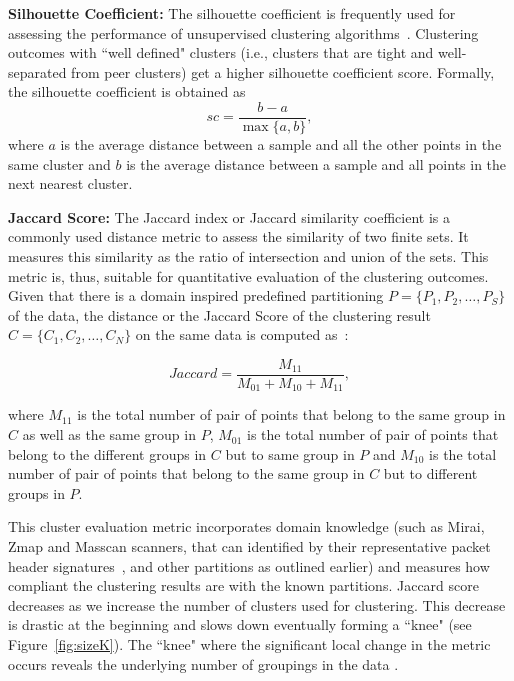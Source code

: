 \documentclass[manuscript, nonacm]{acmart}
\newcommand{\para}[1]{\vspace*{1ex}\noindent\textbf{#1} }
\begin{document}
\para{Silhouette Coefficient:} The silhouette coefficient is frequently used for
assessing the performance of unsupervised clustering algorithms~\cite{Rousseeuw87Silhouettes}. Clustering
outcomes with ``well defined" clusters (i.e., clusters that are tight and 
well-separated from peer clusters) get a higher silhouette coefficient score. Formally,
the silhouette coefficient is obtained as
\begin{equation}
    \mathit{sc} = \frac{b-a}{\max\{a, b\}},
\end{equation}
where $a$ is the average distance between a sample and all the other points in the same cluster and
$b$ is the average distance between a sample and all points in the next nearest cluster.

\para{Jaccard Score:} The Jaccard index or Jaccard similarity coefficient is a commonly used distance metric to assess the similarity of two finite sets. It measures this similarity as the ratio of intersection and union of the sets. This metric is, thus, suitable for quantitative evaluation of the clustering outcomes. Given that there is a domain inspired predefined partitioning $P = \{P_1,P_2,\ldots,P_S\}$ of the data, the distance or the Jaccard Score of the clustering result $C = \{C_1,C_2,\ldots,C_N\}$ on the same data is computed as~\cite{halkidi2001survey}:

\begin{equation}
    \mathit{Jaccard} = \frac{M_{11}}{M_{01} + M_{10} + M_{11}},
\end{equation}

where $M_{11}$ is the total number of pair of points that belong to the same group in $C$ as well as the same group in $P$, $M_{01}$ is the total number of pair of points that belong to the different groups in $C$ but to same group in $P$ and $M_{10}$ is the total number of pair of points that belong to the same group in $C$ but to different groups in $P$.

This cluster evaluation metric incorporates domain knowledge (such as
Mirai, Zmap and Masscan scanners, that can identified
by their representative packet header signatures~\cite{MiraiUSENIX2017, Durumeric:2014:IVI:2671225.2671230}, and other
partitions as outlined earlier)
and measures how compliant the clustering results are with the known partitions. Jaccard score decreases as we increase the number of clusters used for clustering. This decrease is drastic at the beginning and slows down eventually forming a ``knee" (see Figure~\ref{fig:sizeK}). The ``knee" where the significant local change in the metric occurs reveals the underlying number of groupings in the data \cite{halkidi2001survey}.  
\end{document}
